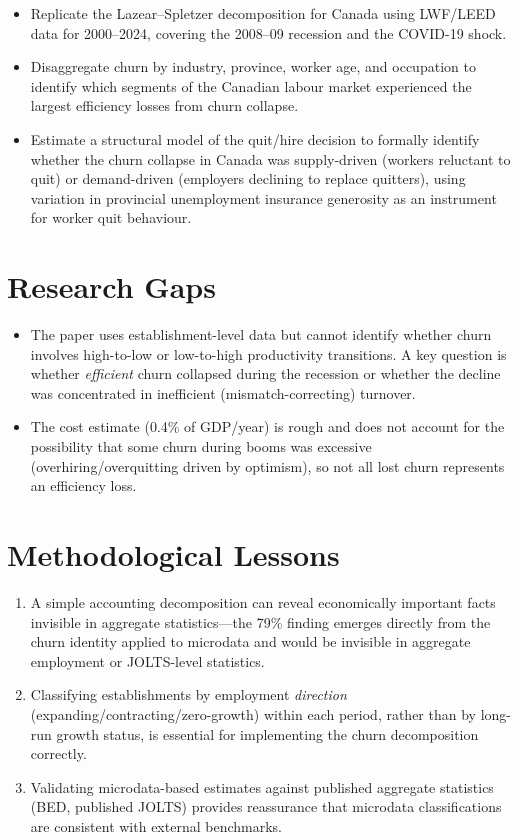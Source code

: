 \begin{itemize}
  \item Replicate the Lazear--Spletzer decomposition for Canada using
    LWF/LEED data for 2000--2024, covering the 2008--09 recession and the
    COVID-19 shock.
  \item Disaggregate churn by industry, province, worker age, and occupation
    to identify which segments of the Canadian labour market experienced the
    largest efficiency losses from churn collapse.
  \item Estimate a structural model of the quit/hire decision to formally
    identify whether the churn collapse in Canada was supply-driven (workers
    reluctant to quit) or demand-driven (employers declining to replace
    quitters), using variation in provincial unemployment insurance generosity
    as an instrument for worker quit behaviour.
\end{itemize}

\section{Research Gaps}

\begin{itemize}
  \item The paper uses establishment-level data but cannot identify whether
    churn involves high-to-low or low-to-high productivity transitions. A key
    question is whether \emph{efficient} churn collapsed during the recession
    or whether the decline was concentrated in inefficient (mismatch-correcting)
    turnover.
  \item The cost estimate (0.4\% of GDP/year) is rough and does not account
    for the possibility that some churn during booms was excessive
    (overhiring/overquitting driven by optimism), so not all lost churn
    represents an efficiency loss.
\end{itemize}

\section{Methodological Lessons}

\begin{enumerate}
  \item A simple accounting decomposition can reveal economically important
    facts invisible in aggregate statistics---the 79\% finding emerges directly
    from the churn identity applied to microdata and would be invisible in
    aggregate employment or JOLTS-level statistics.
  \item Classifying establishments by employment \emph{direction}
    (expanding/contracting/zero-growth) within each period, rather than by
    long-run growth status, is essential for implementing the churn
    decomposition correctly.
  \item Validating microdata-based estimates against published aggregate
    statistics (BED, published JOLTS) provides reassurance that microdata
    classifications are consistent with external benchmarks.
\end{enumerate}

